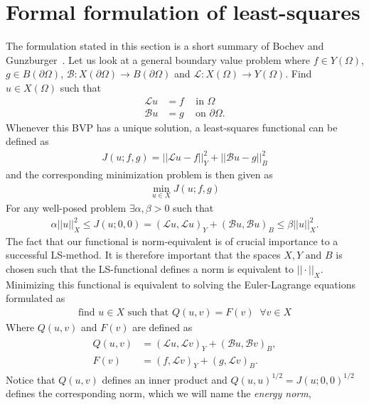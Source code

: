 
\section{Formal formulation of least-squares}
The formulation stated in this section is a short summary of Bochev and Gunzburger~\cite{Bochev}.
Let us look at a general boundary value problem where $f \in Y(\Omega)$, $g \in B(\partial \Omega)$, $\mathcal{B}\colon X(\partial \Omega) \to B(\partial\Omega) $ and $\mathcal{L}\colon X(\Omega)\to Y(\Omega)$. Find $u \in X(\Omega) $ such that 
\begin{align}
	\mathcal{L} u &= f \; \; \; \text{ in } \Omega \\
	\mathcal{B}u &= g \; \; \; \text{ on } \partial \Omega.
	\label{eq:BVP}
\end{align}
Whenever this BVP has a unique solution, a least-squares functional can be defined as 
\begin{align}
	J(u;f,g) = ||\mathcal{L}u-f||^2_Y + ||\mathcal{B}u-g||^2_B
	\label{eq:FunctionalGen}
\end{align}
and the corresponding minimization problem is then given as 
\begin{align}
	\min_{u \in X}J(u;f,g)
	\label{eq:minProbGen}
\end{align}
For any well-posed problem $\exists \alpha,\beta > 0$ such that 
\begin{align}
	\alpha||u||_X^2 \leq J(u;0,0) = (\mathcal{L}u,\mathcal{L}u)_Y+(\mathcal{B}u,\mathcal{B}u)_B \leq \beta||u||_X^2.
	\label{eq:normEq}
\end{align}
The fact that our functional is norm-equivalent is of crucial importance to a successful LS-method. It is therefore important that the spaces $X,Y \text{ and } B$ is chosen such that the LS-functional defines a norm is equivalent to $|| \cdot ||_X$.
Minimizing this functional is equivalent to solving the Euler-Lagrange equations formulated as 
\begin{align}
	\text{find } u \in X \text{  such that  } Q(u,v) = F(v) \; \; \forall v\in X
	\label{eq:varFormGen}
\end{align}
Where $Q(u,v)$ and $F(v)$ are defined as 
\begin{align}
	\begin{split}
	Q(u,v) &= (\mathcal{L}u,\mathcal{L}v)_Y+(\mathcal{B}u,\mathcal{B}v)_B, \\
	F(v) &= (f,\mathcal{L}v)_Y+(g,\mathcal{L}v)_B.
	\end{split}
	\label{eq:VarFormLinForms}
\end{align}
%
Notice that $Q(u,v)$ defines an inner product and $Q(u,u)^{1/2}=J(u;0,0)^{1/2}$ defines the corresponding norm, which we will name the \textit{energy norm},

